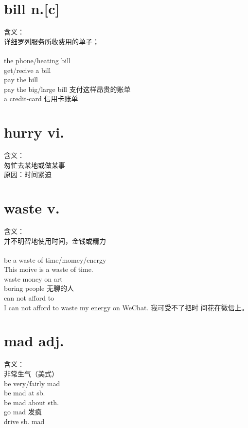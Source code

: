 \documentclass[twocolumn]{ctexbook}
\newcommand{\phrase}[1]{{\colorbox{yellow!40}{#1}}}
\newcommand{\point}[1]{{\color{red}#1}}
\newcommand{\word}[1]{{\em\color{black}{#1}}}
\begin{document}
        \section{bill n.[c]}
        含义：\\
        详细罗列服务所收\point{费用}的单子；\\
        \word{账单}\\
        \phrase{the phone/heating bill \\ get/recive a bill\\pay the bill}\\
        pay the big/large bill 支付这样昂贵的账单\\
        a credit-card \word{bill} 信用卡账单\\
        \section{hurry vi.}
        含义：\\
        匆忙去\point{某地}或\point{做某事}\\
        原因：时间紧迫\\
        \section{waste v.}
        含义：\\
        并不明智地使用\point{时间，金钱或精力}\\
        \word{waste n.[U]}\\
        be a waste of time/momey/energy\\
        This moive is a waste of time.\\
        waste money \point{on} art\\
        boring people 无聊的人\\
        can \point{not} afford to \word{waste}\\
        I can not afford to waste my energy on WeChat.  我可受不了把时
        间花在微信上。\\
        \section{mad adj.}
        含义：\\
        非常生气（美式）\\
        be very/fairly mad\\
        be mad at sb.\\
        be mad about sth.\\
        go mad 发疯\\
        drive sb. mad \\
\end{document}

